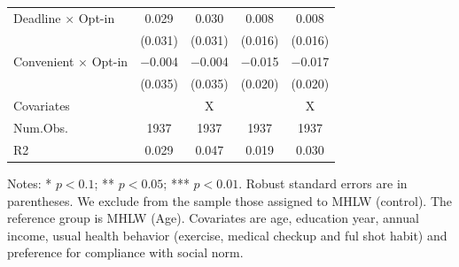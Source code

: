 \documentclass[
]{article}
\begin{document}
\begin{table}
\begin{threeparttable}
\begin{tabular}[t]{lcccc}
Deadline $\times$ Opt-in & \num{0.029} & \num{0.030} & \num{0.008} & \num{0.008}\\
 & (\num{0.031}) & (\num{0.031}) & (\num{0.016}) & (\num{0.016})\\
Convenient $\times$ Opt-in & \num{-0.004} & \num{-0.004} & \num{-0.015} & \num{-0.017}\\
 & (\num{0.035}) & (\num{0.035}) & (\num{0.020}) & (\num{0.020})\\
\midrule
Covariates &  & X &  & X\\
Num.Obs. & \num{1937} & \num{1937} & \num{1937} & \num{1937}\\
R2 & \num{0.029} & \num{0.047} & \num{0.019} & \num{0.030}\\
\bottomrule
\end{tabular}
\begin{tablenotes}
\item Notes: * $p < 0.1$; ** $p < 0.05$; *** $p < 0.01$. Robust standard errors are in parentheses. We exclude from the sample those assigned to MHLW (control). The reference group is MHLW (Age). Covariates are age, education year, annual income, usual health behavior (exercise, medical checkup and ful shot habit) and preference for compliance with social norm.
\end{tablenotes}
\end{threeparttable}
\end{table}
\end{document}
